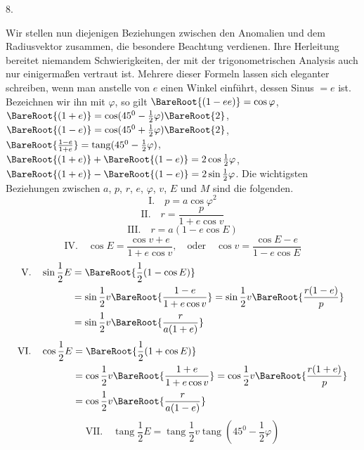 \par{}
\begin{center}
8.
\end{center}
Wir stellen nun diejenigen Beziehungen zwischen den Anomalien und dem Radiusvektor
zusammen, die besondere Beachtung verdienen. Ihre Herleitung bereitet niemandem
Schwierigkeiten, der mit der trigonometrischen Analysis auch nur einigermaßen vertraut
ist. Mehrere dieser Formeln lassen sich eleganter schreiben, wenn man anstelle von $e$
einen Winkel einführt, dessen Sinus $=e$ ist. Bezeichnen wir ihn mit $\varphi$, so gilt $\BareRoot{(1-ee)}=\cos\varphi$, $\BareRoot{(1+e)}=\cos(45^0-\frac{1}{2}\varphi)\BareRoot{2}$, $\BareRoot{(1-e)}=\cos(45^0+\frac{1}{2}\varphi)\BareRoot{2}$, $\BareRoot{\frac{1-e}{1+e}}=\operatorname{tang}(45^0-\frac{1}{2}\varphi)$, $\BareRoot{(1+e)}+\BareRoot{(1-e)}=2\cos\frac{1}{2}\varphi$, $\BareRoot{(1+e)}-\BareRoot{(1-e)}=2\sin\frac{1}{2}\varphi$. Die wichtigsten Beziehungen zwischen $a$, $p$, $r$, $e$, $\varphi$, $v$, $E$ und $M$ sind die folgenden.\HistoricalNoteEight{Handschriftliche Bemerkung:]
\[
\begin{gathered}
1=\cos v\cos E+\frac{\sin v\sin E}{\cos\varphi},\\
\cos\varphi=\frac{\sin v\sin E}{1-\cos v\cos E},\\
\sin\varphi=\frac{\cos E-\cos v}{1-\cos v\cos E}\cdot
\end{gathered}
\]
}
\[
\mathrm{I.}\quad p=a\cos\varphi^2
\]
\[
\mathrm{II.}\quad r=\frac{p}{1+e\cos v}
\]
\[
\mathrm{III.}\quad r=a(1-e\cos E)
\]
\[
\mathrm{IV.}\quad \cos E=\frac{\cos v+e}{1+e\cos v},\quad\mathrm{oder}\quad\cos v=\frac{\cos E-e}{1-e\cos E}
\]
\[
\begin{aligned}
\mathrm{V.}\quad\sin\frac{1}{2}E&=\BareRoot{\frac{1}{2}(1-\cos E)}\\
&=\sin\frac{1}{2}v\BareRoot{\frac{1-e}{1+e\cos v}}=\sin\frac{1}{2}v\BareRoot{\frac{r(1-e)}{p}}\\
&=\sin\frac{1}{2}v\BareRoot{\frac{r}{a(1+e)}}
\end{aligned}
\]
\[
\begin{aligned}
\mathrm{VI.}\quad\cos\frac{1}{2}E&=\BareRoot{\frac{1}{2}(1+\cos E)}\\
&=\cos\frac{1}{2}v\BareRoot{\frac{1+e}{1+e\cos v}}=\cos\frac{1}{2}v\BareRoot{\frac{r(1+e)}{p}}\\
&=\cos\frac{1}{2}v\BareRoot{\frac{r}{a(1-e)}}
\end{aligned}
\]
\[
\mathrm{VII.}\quad\operatorname{tang}\frac{1}{2}E=\operatorname{tang}\frac{1}{2}v\operatorname{tang}(45^0-\frac{1}{2}\varphi)
\]
